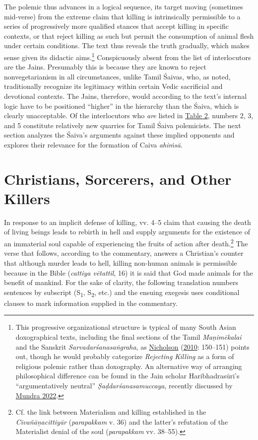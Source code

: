 The polemic thus advances in a logical sequence, its target moving (sometimes mid-verse) from the extreme claim that killing is intrinsically permissible to a series of progressively more qualified stances that accept killing in specific contexts, or that reject killing as such but permit the consumption of animal flesh under certain conditions. The text thus reveals the truth gradually, which makes sense given its didactic aims.\footnote{%
This progressive organizational structure is typical of many South Asian doxographical texts, including the final sections of the Tamil \emph{{Maṇimēkalai}} and the Sanskrit \emph{{Sarvadarśanasaṅgraha}}, as \hyperref[Nicholson2010]{Nicholson} (\hyperref[Nicholson2010]{2010}: 150–151) points out, though he would probably categorize \emph{Rejecting Killing} as a form of religious polemic rather than doxography. An alternative way of arranging philosophical difference can be found in the Jain scholar Haribhadrasūri’s “argumentatively neutral” \emph{{Ṣaḍdarśanasamuccaya}}, recently discussed by \hyperref[Mundra2022]{Mundra 2022}.
}
 Conspicuously absent from the list of interlocutors are the Jains. Presumably this is because they are known to reject nonvegetarianism in all circumstances, unlike Tamil Śaivas, who, as noted, traditionally recognize its legitimacy within certain Vedic sacrificial and devotional contexts. The Jains, therefore, would according to the text’s internal logic have to be positioned “higher” in the hierarchy than the Śaiva, which is clearly unacceptable. Of the interlocutors who \emph{are} listed in \hyperref[tab2]{Table 2}, numbers 2, 3, and 5 constitute relatively new quarries for Tamil Śaiva polemicists. The next section analyzes the Śaiva’s arguments against these implied opponents and explores their relevance for the formation of Caiva \emph{ahiṁsā}.

\section{Christians, Sorcerers, and Other Killers}
      In response to an implicit defense of killing, vv. 4–5 claim that causing the death of living beings leads to rebirth in hell and supply arguments for the existence of an immaterial soul capable of experiencing the fruits of action after death.\footnote{%
Cf. the link between Materialism and killing established in the \emph{{Civañāṉacittiyār}} (\emph{parapakkam} v. 36) and the latter’s refutation of the Materialist denial of the soul (\emph{parapakkam} vv. 38–55).
}
 The verse that follows, according to the commentary, answers a Christian’s counter that although murder leads to hell, killing non-human animals is permissible because in the Bible (\emph{cattiya vētattil}, 16) it is said that God made animals for the benefit of mankind. For the sake of clarity, the following translation numbers sentences by subscript (S\textsubscript{1}, S\textsubscript{2}, etc.) and the ensuing exegesis uses conditional clauses to mark information supplied in the commentary.

